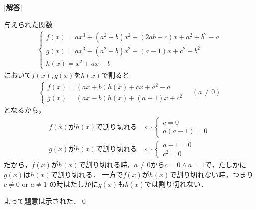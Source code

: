 \documentclass[../../main.tex]{subfiles}
\begin{document}
\begin{oframed}
  
\end{oframed}

{\bf [解答]}

与えられた関数
\begin{align}
  \begin{cases}
    f(x)=ax^3+(a^2+b)x^2+(2ab+c)x+a^2+b^2-a \\
    g(x)=ax^3+(a^2-b)x^2+(a-1)x+c^2-b^2 \\
    h(x)=x^2+ax+b
  \end{cases}
\end{align}
において$f(x),g(x)$を$h(x)$で割ると
\begin{align}
  \begin{cases}
    f(x) = (ax+b)h(x) + cx + a^2-a \\
    g(x) = (ax-b)h(x) + (a-1)x + c^2
  \end{cases} \quad (a \neq 0) \label{eq:1}
\end{align}
となるから，
\begin{align}
  f(x)\text{が}h(x)\text{で割り切れる} &\iff
  \begin{cases} c=0 \\ a(a-1)=0
  \end{cases}  \\
  g(x)\text{が}h(x)\text{で割り切れる}  &\iff
  \begin{cases} a-1=0 \\ c^2=0
  \end{cases}
\end{align}
だから，$f(x)$が$h(x)$で割り切れる時，$a \neq 0$から$c=0 \land a=1$で，たしかに$g(x)$は$h(x)$で割り切れる．
一方で$f(x)$が$h(x)$で割り切れない時，つまり $c \neq 0$ or $a \neq 1$ の時はたしかに$g(x)$も$h(x)$では割り切れない．

よって題意は示された．\qed
\end{document}
